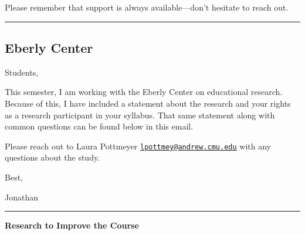 \documentclass[]{tufte-handout}
\begin{document}
Please remember that support is always available---don't hesitate to
reach out.

\begin{center}\rule{0.5\linewidth}{0.5pt}\end{center}

\hypertarget{eberly-center}{%
\subsection{Eberly Center}\label{eberly-center}}

Students,

This semester, I am working with the Eberly Center on educational
research. Because of this, I have included a statement about the
research and your rights as a research participant in your syllabus.
That same statement along with common questions can be found below in
this email.

Please reach out to Laura Pottmeyer
\href{mailto:lpottmey@andrew.cmu.edu}{\nolinkurl{lpottmey@andrew.cmu.edu}}
with any questions about the study.

Best,

Jonathan

\begin{center}\rule{0.5\linewidth}{0.5pt}\end{center}

\textbf{Research to Improve the Course}
\end{document}
